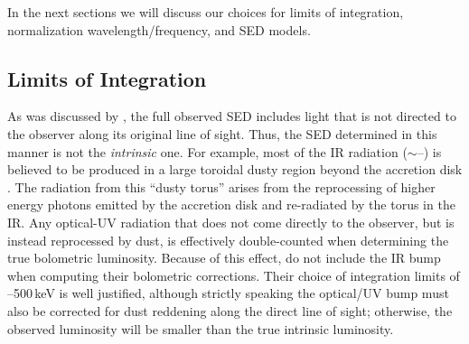 In the next sections we will discuss our choices for limits of integration, normalization wavelength/frequency, and SED models.

\subsection{Limits of Integration}

As was discussed by \citet{Marconi:2004}, the full observed SED includes
light that is not directed to the observer along its original line of
sight.  Thus, the SED determined in this manner is not the {\em
  intrinsic} one.  For example, most of the IR radiation ($\sim$\thirtymum --\onemum) is believed
to be produced in a large toroidal dusty region beyond the accretion
disk \citep[e.g.,][]{Krolik:1988,Elitzur:2006}.  The radiation from this ``dusty
torus'' arises from the reprocessing of higher energy photons emitted
by the accretion disk and re-radiated by the torus in the IR.  
Any 
optical-UV radiation that does not come directly to the observer, but is instead reprocessed by dust, is effectively double-counted when determining the true bolometric luminosity.
Because of this effect,
\citet{Marconi:2004} do not include the IR bump when computing their
bolometric corrections.  Their choice of integration limits of \onemum --500\,keV is well
justified, although strictly speaking the optical/UV bump must also be
corrected for dust reddening along the direct line of sight;
otherwise, the observed luminosity will be smaller than the true intrinsic luminosity.

